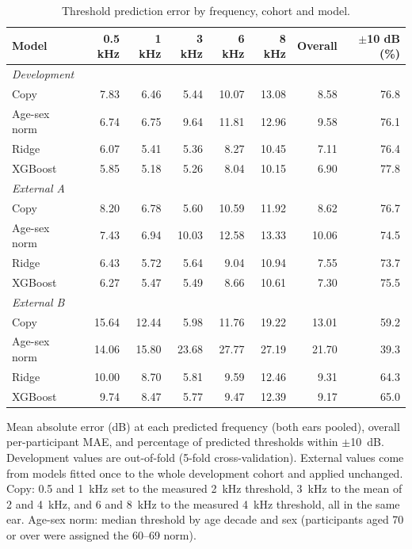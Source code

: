 \begin{table}[p]
\centering
\caption{Threshold prediction error by frequency, cohort and model.}
\label{tab:mae}
\small
\begin{tabular}{l rrrrr rr}
\toprule
Model & 0.5 kHz & 1 kHz & 3 kHz & 6 kHz & 8 kHz & Overall & $\pm$10 dB (\%) \\
\midrule
\multicolumn{8}{l}{\textit{Development}} \\
\quad Copy & 7.83 & 6.46 & 5.44 & 10.07 & 13.08 & 8.58 & 76.8 \\
\quad Age-sex norm & 6.74 & 6.75 & 9.64 & 11.81 & 12.96 & 9.58 & 76.1 \\
\quad Ridge & 6.07 & 5.41 & 5.36 & 8.27 & 10.45 & 7.11 & 76.4 \\
\quad XGBoost & 5.85 & 5.18 & 5.26 & 8.04 & 10.15 & 6.90 & 77.8 \\
\multicolumn{8}{l}{\textit{External A}} \\
\quad Copy & 8.20 & 6.78 & 5.60 & 10.59 & 11.92 & 8.62 & 76.7 \\
\quad Age-sex norm & 7.43 & 6.94 & 10.03 & 12.58 & 13.33 & 10.06 & 74.5 \\
\quad Ridge & 6.43 & 5.72 & 5.64 & 9.04 & 10.94 & 7.55 & 73.7 \\
\quad XGBoost & 6.27 & 5.47 & 5.49 & 8.66 & 10.61 & 7.30 & 75.5 \\
\multicolumn{8}{l}{\textit{External B}} \\
\quad Copy & 15.64 & 12.44 & 5.98 & 11.76 & 19.22 & 13.01 & 59.2 \\
\quad Age-sex norm & 14.06 & 15.80 & 23.68 & 27.77 & 27.19 & 21.70 & 39.3 \\
\quad Ridge & 10.00 & 8.70 & 5.81 & 9.59 & 12.46 & 9.31 & 64.3 \\
\quad XGBoost & 9.74 & 8.47 & 5.77 & 9.47 & 12.39 & 9.17 & 65.0 \\
\bottomrule
\end{tabular}
\par\smallskip\raggedright
Mean absolute error (dB) at each predicted frequency (both ears pooled), overall per-participant MAE, and percentage of predicted thresholds within $\pm$10~dB. Development values are out-of-fold (5-fold cross-validation). External values come from models fitted once to the whole development cohort and applied unchanged. Copy: 0.5 and 1~kHz set to the measured 2~kHz threshold, 3~kHz to the mean of 2 and 4~kHz, and 6 and 8~kHz to the measured 4~kHz threshold, all in the same ear. Age-sex norm: median threshold by age decade and sex (participants aged 70 or over were assigned the 60--69 norm).
\end{table}
